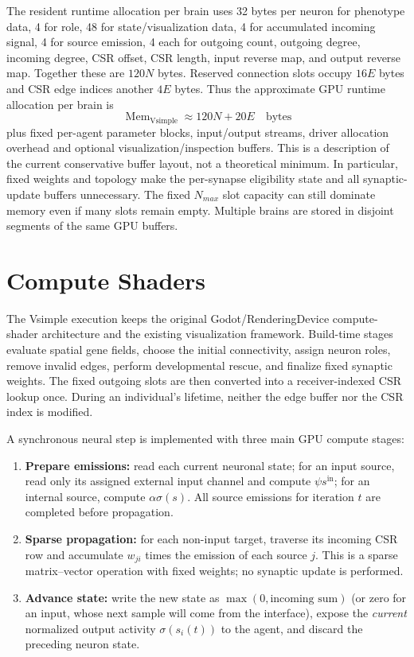 \documentclass[12pt,a4paper]{article}
\begin{document}
The resident runtime allocation per brain uses 32 bytes per neuron for phenotype data, 4 for role, 48 for state/visualization data, 4 for accumulated incoming signal, 4 for source emission, 4 each for outgoing count, outgoing degree, incoming degree, CSR offset, CSR length, input reverse map, and output reverse map. Together these are $120N$ bytes. Reserved connection slots occupy $16E$ bytes and CSR edge indices another $4E$ bytes. Thus the approximate GPU runtime allocation per brain is
\begin{equation}
\boxed{\operatorname{Mem}_{\mathrm{Vsimple}}\approx120N+20E\quad\text{bytes}}
\label{simple_memory}
\end{equation}
plus fixed per-agent parameter blocks, input/output streams, driver allocation overhead and optional visualization/inspection buffers. This is a description of the current conservative buffer layout, not a theoretical minimum. In particular, fixed weights and topology make the per-synapse eligibility state and all synaptic-update buffers unnecessary. The fixed $N_{max}$ slot capacity can still dominate memory even if many slots remain empty. Multiple brains are stored in disjoint segments of the same GPU buffers.

\section{Compute Shaders}
The Vsimple execution keeps the original Godot/RenderingDevice compute-shader architecture and the existing visualization framework. Build-time stages evaluate spatial gene fields, choose the initial connectivity, assign neuron roles, remove invalid edges, perform developmental rescue, and finalize fixed synaptic weights. The fixed outgoing slots are then converted into a receiver-indexed CSR lookup once. During an individual's lifetime, neither the edge buffer nor the CSR index is modified.

A synchronous neural step is implemented with three main GPU compute stages:
\begin{enumerate}
\item \textbf{Prepare emissions:} read each current neuronal state; for an input source, read only its assigned external input channel and compute $\psi s^{\mathrm{in}}$; for an internal source, compute $\alpha\sigma(s)$. All source emissions for iteration $t$ are completed before propagation.
\item \textbf{Sparse propagation:} for each non-input target, traverse its incoming CSR row and accumulate $w_{ji}$ times the emission of each source $j$. This is a sparse matrix--vector operation with fixed weights; no synaptic update is performed.
\item \textbf{Advance state:} write the new state as $\max(0,\text{incoming sum})$ (or zero for an input, whose next sample will come from the interface), expose the \emph{current} normalized output activity $\sigma(s_i(t))$ to the agent, and discard the preceding neuron state.
\end{enumerate}
\end{document}
